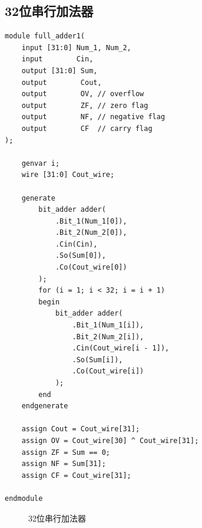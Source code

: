 \documentclass[AutoFakeBold]{LZUThesis}
\begin{document}
    \subsection{32位串行加法器}
    \begin{lstlisting}
module full_adder1(
    input [31:0] Num_1, Num_2,
    input        Cin,
    output [31:0] Sum,
    output        Cout,
    output        OV, // overflow
    output        ZF, // zero flag
    output        NF, // negative flag
    output        CF  // carry flag
);

    genvar i;
    wire [31:0] Cout_wire;

    generate
        bit_adder adder(
            .Bit_1(Num_1[0]),
            .Bit_2(Num_2[0]),
            .Cin(Cin),
            .So(Sum[0]),
            .Co(Cout_wire[0])
        );
        for (i = 1; i < 32; i = i + 1)
        begin
            bit_adder adder(
                .Bit_1(Num_1[i]),
                .Bit_2(Num_2[i]),
                .Cin(Cout_wire[i - 1]),
                .So(Sum[i]),
                .Co(Cout_wire[i])
            );
        end
    endgenerate

    assign Cout = Cout_wire[31];
    assign OV = Cout_wire[30] ^ Cout_wire[31];
    assign ZF = Sum == 0;
    assign NF = Sum[31];
    assign CF = Cout_wire[31];

endmodule
    \end{lstlisting}
    \begin{figure}[htbp]
        \centering
        \centering
        \caption{32位串行加法器}
    \end{figure}
\end{document}
